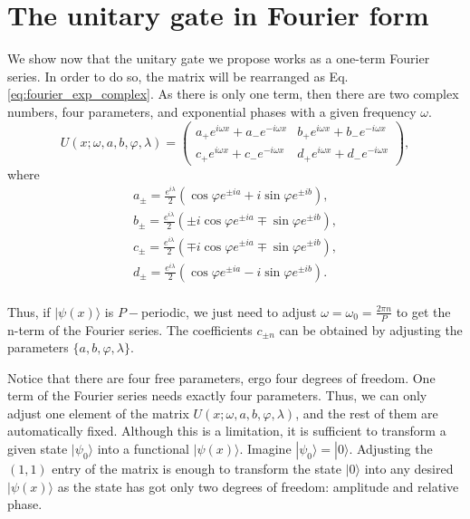 \documentclass[aps,amssymb,amsmath,amsfonts,pra,superscriptaddress,onecolumn]{revtex4}
\newcommand{\ket}[1]{| #1 \rangle}
\begin{document}
\section{The unitary gate in Fourier form}
We show now that the unitary gate we propose works as a one-term Fourier series. In order to do so, the matrix will be rearranged as Eq. \eqref{eq:fourier_exp_complex}. As there is only one term, then there are two complex numbers, four parameters, and exponential phases with a given frequency $\omega$.
\begin{equation}\label{eq:unitary_2}
    U(x; \omega, a, b, \varphi, \lambda) = 
    \begin{pmatrix}
    a_+ e^{i\omega x} + a_- e^{- i \omega x} & b_+ e^{i\omega x} + b_- e^{- i \omega x} \\
    c_+ e^{i\omega x} + c_- e^{- i \omega x} & d_+ e^{i\omega x} + d_- e^{- i \omega x}
    \end{pmatrix},
\end{equation}
where
\begin{eqnarray}
    a_\pm = \frac{e^{i\lambda}}{2} \left(\cos\varphi e^{\pm ia} + i \sin\varphi e^{\pm ib}\right), \\
    b_\pm = \frac{e^{i\lambda}}{2} \left(\pm i \cos\varphi e^{\pm ia} \mp \sin\varphi e^{\pm ib}\right), \\
    c_\pm = \frac{e^{i\lambda}}{2} \left(\mp i \cos\varphi e^{\pm ia} \mp \sin\varphi e^{\pm ib}\right), \\
    d_\pm = \frac{e^{i\lambda}}{2} \left(\cos\varphi e^{\pm ia} - i \sin\varphi e^{\pm ib}\right). \\
\end{eqnarray}

Thus, if $\ket{\psi(x)}$ is $P-$periodic, we just need to adjust $\omega = \omega_0 = \frac{2\pi n}{P}$ to get the n-term of the Fourier series. The coefficients $c_{\pm n}$ can be obtained by adjusting the parameters $\lbrace a, b, \varphi, \lambda\rbrace$. 

Notice that there are four free parameters, ergo four degrees of freedom. One term of the Fourier series needs exactly four parameters. Thus, we can only adjust one element of the matrix $U(x; \omega, a, b, \varphi, \lambda)$, and the rest of them are automatically fixed. Although this is a limitation, it is sufficient to transform a given state $\ket{\psi_0}$ into a functional $\ket{\psi(x)}$. Imagine $\ket{\psi_0} = \ket{0}$. Adjusting the $(1,1)$ entry of the matrix is enough to transform the state $\ket 0$ into any desired $\ket{\psi(x)}$ as the state has got only two degrees of freedom: amplitude and relative phase.
\end{document}
